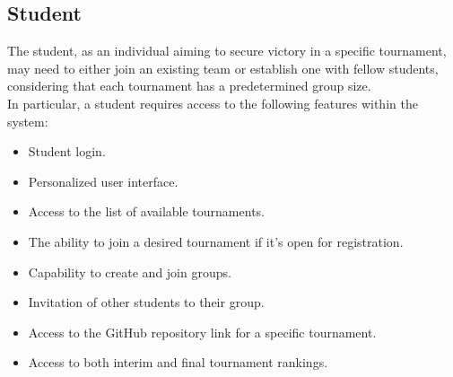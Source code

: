 \documentclass[12pt, a4paper]{report}
\begin{document}
    \subsection{Student}
    The student, as an individual aiming to secure victory in a specific tournament, may need to either join an existing team or establish one with fellow students, 
    considering that each tournament has a predetermined group size. \\
    In particular, a student requires access to the following features within the system:
    \begin{itemize}
        \item Student login.
        \item Personalized user interface. 
        \item Access to the list of available tournaments.
        \item The ability to join a desired tournament if it's open for registration.
        \item Capability to create and join groups.
        \item Invitation of other students to their group.
        \item Access to the GitHub repository link for a specific tournament.
        \item Access to both interim and final tournament rankings.
    \end{itemize}
\end{document}

